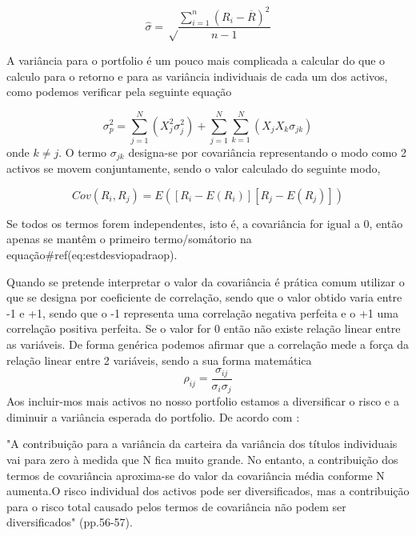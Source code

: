 \documentclass[
  12pt,
  a4paper,
  openany]{book}
\begin{document}
\begin{equation} 
  \hat{\sigma} = \sqrt\frac{\displaystyle\sum_{i=1}^n (R_i-\overline{R})^2}{n-1}
  \label{eq:estdesviopadrao}
\end{equation}

A variância para o portfolio é um pouco mais complicada a calcular do que o calculo para o retorno e para as variância individuais de cada um dos activos, como podemos verificar pela seguinte equação

\begin{equation} 
  \sigma_{p}^{2} = \sum_{j=1}^{N}(X_{j}^{2}\sigma_{j}^{2})+\sum_{j=1}^{N}\sum_{k=1}^{N}(X_{j}X_{k}\sigma_{jk})
  \label{eq:estdesviopadraop}
\end{equation}
onde \(k\neq j\). O termo \(\sigma_{jk}\) designa-se por covariância representando o modo como 2 activos se movem conjuntamente, sendo o valor calculado do seguinte modo,

\begin{equation} 
  Cov(R_{i},R_{j}) = E([R_{i}-E(R_{i})][R_{j}-E(R_{j})])
  \label{eq:covariancia}
\end{equation}

Se todos os termos forem independentes, isto é, a covariância for igual a 0, então apenas se mantêm o primeiro termo/somátorio na equação\#ref(eq:estdesviopadraop).

Quando se pretende interpretar o valor da covariância é prática comum utilizar o que se designa por coeficiente de correlação, sendo que o valor obtido varia entre -1 e +1, sendo que o -1 representa uma correlação negativa perfeita e o +1 uma correlação positiva perfeita. Se o valor for 0 então não existe relação linear entre as variáveis. De forma genérica podemos afirmar que a correlação mede a força da relação linear entre 2 variáveis, sendo a sua forma matemática \[\rho_{ij}=\frac{\sigma_{ij}}{\sigma_{i}\sigma_{j}}\]
Aos incluir-mos mais activos no nosso portfolio estamos a diversificar o risco e a diminuir a variância esperada do portfolio. De acordo com \citet{Goetzmann2014}:

\begin{spacing}{1}
\begin{adjustwidth}{28.3464pt}{28.3464pt}\footnotesize
"A contribuição para a variância da carteira da variância dos títulos individuais vai para zero à medida que N fica muito grande. No entanto, a contribuição dos termos de covariância aproxima-se do valor da covariância média conforme N aumenta.O risco individual dos activos pode ser diversificados, mas a contribuição para o risco total causado pelos termos de covariância não podem ser diversificados" (pp.56-57).
\normalsize\end{adjustwidth}
\end{spacing}
\medskip
\end{document}
